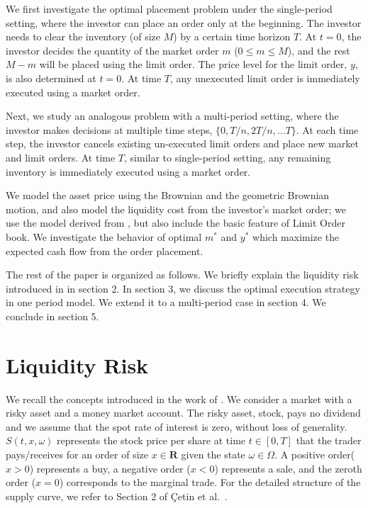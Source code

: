 \documentclass[11pt]{article}
\theoremstyle{plain}
\numberwithin{equation}{section}
\begin{document}
\par We first investigate the optimal placement problem under the single-period setting, where the investor can place an order only at the beginning. The investor needs to clear the inventory (of size $M$) by a certain time horizon $T$. At $t=0$, the investor decides the quantity of the market order $m$ ($0\leq m \leq M$), and the rest $M-m$ will be placed using the limit order. The price level for the limit order, $y$, is also determined at $t=0$. At time $T$, any unexecuted limit order is immediately executed using a market order. 

\par Next, we study an analogous problem with a multi-period setting, where the investor makes decisions at multiple time steps, $\{0,T/n, 2T/n , \dots T \}$. At each time step, the investor cancels existing un-executed limit orders and place new market and limit orders. At time $T$, similar to single-period setting, any remaining inventory is immediately executed using a market order.

\par We model the asset price using the Brownian and the geometric Brownian motion, and also model the liquidity cost from the investor's market order; we use the model derived from \cite{CJP:2003}, but also include the basic feature of Limit Order book. We investigate the behavior of optimal $m^*$ and $y^*$ which maximize the expected cash flow from the order placement. 
 
\par The rest of the paper is organized as follows. We briefly explain the liquidity risk introduced in \cite{CJP:2003} in section 2. In section 3, we discuss the optimal execution strategy in one period model. We extend it to a multi-period case in section 4. We conclude in section 5. 





\section{Liquidity Risk}

We recall the concepts introduced in the
work of \citet{CJP:2003}. We consider a market with a risky asset and
a money market account. The risky asset, stock, pays no dividend and we assume
that the spot rate of interest is zero, without loss of generality.
$S(t,x,\omega)$ represents the stock price per share at time
$t \in [0,T]$ that the trader pays/receives for an order of size $x \in \mathbf{R}$ given the state $\omega \in \Omega$.
A positive order($x>0$) represents a buy, a negative order ($x<0$)
represents a sale, and the zeroth order ($x=0$) corresponds to
the marginal trade. For the detailed structure of the supply curve, we refer to Section 2 of \c{C}etin et al.~\cite{CJP:2003}.
\end{document}
